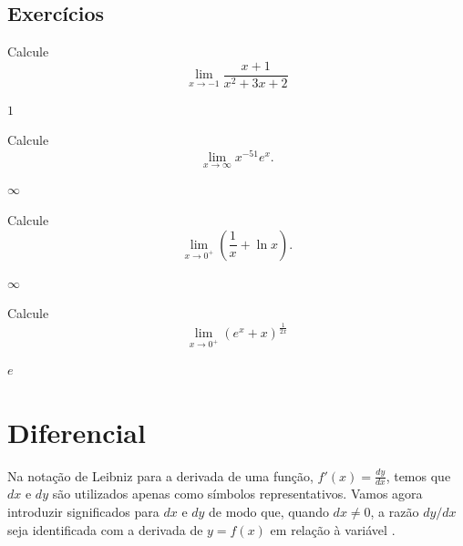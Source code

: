 \cleardoublepage\documentclass[../main.tex]{subfiles}
\begin{document}
\subsection{Exercícios}
\begin{multicols}{2}
\begin{exer}
  Calcule
  \begin{equation*}
    \lim_{x\to -1} \frac{x+1}{x^2+3x+2}
  \end{equation*}
\end{exer}
\begin{resp}
  $1$
\end{resp}

\begin{exer}
  Calcule
  \begin{equation*}
    \lim_{x\to \infty} x^{-51}e^x.
  \end{equation*}
\end{exer}
\begin{resp}
  $\infty$
\end{resp}

\begin{exer}
  Calcule
  \begin{equation*}
    \lim_{x\to 0^+} \left(\frac{1}{x}+\ln x\right).
  \end{equation*}
\end{exer}
\begin{resp}
  $\infty$
\end{resp}

\begin{exer}
  Calcule
  \begin{equation*}
    \lim_{x\to 0^+} \left(e^x + x\right)^{\frac{1}{2x}}
  \end{equation*}
\end{exer}
\begin{resp}
  $e$
\end{resp}
\end{multicols}
\section{Diferencial}\hypertarget{Diff}{}\label{sec:diferencial}
Na notação de Leibniz para a derivada de uma função, $f'(x)=\frac{dy}{dx}$, temos que $dx$ e $dy$ são utilizados apenas como símbolos representativos. Vamos agora introduzir significados para $dx$ e $dy$ de modo que, quando $dx\neq  0$, a razão $dy/dx$
seja identificada com a derivada de $y= f(x)$ em relação à variável \x.
\end{document}
